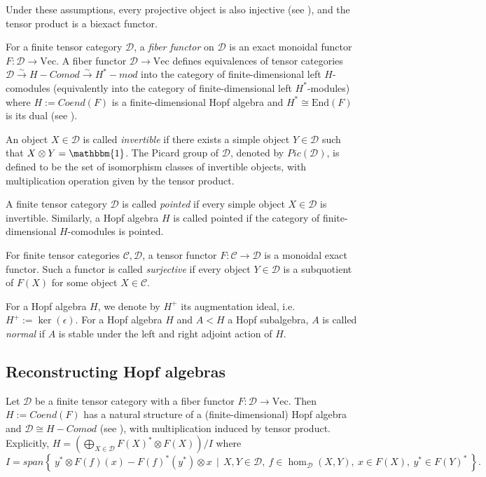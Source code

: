 \documentclass{amsart}
\theoremstyle{plain}%
\theoremstyle{remark}
\newcommand{\C}{\mathcal{C}}
\newcommand{\1}{\mathbbm{1}}
\newcommand{\D}{\mathcal{D}}
\newcommand{\End}{\mathrm{End}}
\newcommand{\Vect}{\mathrm{Vec}}
\newcommand{\eps}{\epsilon}
\begin{document}
        Under these assumptions, every projective object is also injective (see \cite[Proposition 6.1.3]{EGNO}), and the tensor product is a biexact functor.

        For a finite tensor category $\D$, a \textit{fiber functor} on $\D$ is an exact monoidal functor $F:\D\to \Vect$. 
        A fiber functor $\D\to \Vect$ defines equivalences of tensor categories $\D\xrightarrow{\sim} H-Comod\xrightarrow{\sim} H^*-mod$ into the category of finite-dimensional left $H$-comodules (equivalently into the category of finite-dimensional left $H^*$-modules) where $H:=Coend(F)$ is a finite-dimensional Hopf algebra and $H^*\cong \End(F)$ is its dual (see \cite[Theorem 5.3.12]{EGNO}).

        An object $X\in{\D}$ is called {\it invertible} if there exists a simple object $Y\in \D$ such that $X\otimes Y = \1$. The Picard group of $\D$, denoted by $Pic(\D)$, is defined to be the set of isomorphism classes of invertible objects, with multiplication operation given by the tensor product.

        A finite tensor category $\D$ is called \textit{pointed} if every simple object $X\in{\D}$ is invertible. Similarly, a Hopf algebra $H$ is called pointed if the category of finite-dimensional $H$-comodules is pointed.

        For finite tensor categories $\C,\D$, a tensor functor $F:\C\to \D$ is a monoidal exact functor. Such a functor is called \textit{surjective} if every object $Y\in \D$ is a subquotient of $F(X)$ for some object $X\in \C$.
        
        For a Hopf algebra $H$, we denote by $H^+$ its augmentation ideal, i.e. $H^+:=\ker(\eps)$. For a Hopf algebra $H$ and $A<H$ a Hopf subalgebra, $A$ is called \textit{normal} if $A$ is stable under the left and right adjoint action of $H$. 
    \subsection{Reconstructing Hopf algebras}
        Let $\D$ be a finite tensor category with a fiber functor $F: \D\to \Vect$. Then $H:=Coend(F)$ has a natural structure of a (finite-dimensional) Hopf algebra and $\D\cong H-Comod$ (see \cite[Sections 1.10, 5.3]{EGNO}), with multiplication induced by tensor product. Explicitly, $H=\left(\bigoplus_{X\in \D} F(X)^*\otimes F(X)\right)/I$ where $$I = span\left\{~y^*\otimes F(f)(x)-F(f)^*(y^*)\otimes x ~~| ~~X, Y\in \D,~ f\in \hom_{\D}(X,Y),~ x\in F(X), ~y^*\in F(Y)^*~\right\}.$$
 
\end{document}
